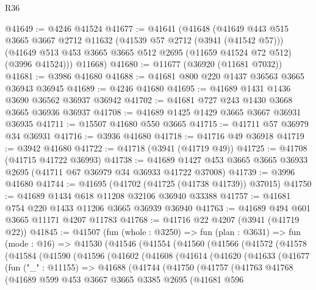 \begin{lexlean}{R36}
\begin{coremodule}
@41649 := @4246 @41524
@41677 := @41641
    (@41648
      (@41649
        @443
        @515
        @3665
        @3667
        @2712
        @11632
        (@41539 @57 @2712 (@3941 (@41542 @57)))
        (@41649 @513 @453 @3665 @3665 @512 @2695 (@11659 @41524 @72 @512) (@3996 @41524)))
      @11668)
@41680 := @11677 (@36920 (@11681 @7032))
@41681 := @3986 @41680
@41688 := @41681 @800 @220 @1437 @36563 @3665 @36943 @36945
@41689 := @4246 @41680
@41695 := @41689 @1431 @1436 @3690 @36562 @36937 @36942
@41702 := @41681 @727 @243 @1430 @3668 @3665 @36936 @36937
@41708 := @41689 @1425 @1429 @3665 @3667 @36931 @36935
@41711 := @15507 @41680 @550 @3665
@41715 := @41711 @57 @36979 @34 @36931
@41716 := @3936 @41680
@41718 := @41716 @49 @36918
@41719 := @3942 @41680
@41722 := @41718 (@3941 (@41719 @49))
@41725 := @41708 (@41715 @41722 @36993)
@41738 := @41689 @1427 @453 @3665 @3665 @36933 @2695 (@41711 @67 @36979 @34 @36933 @41722 @37008)
@41739 := @3996 @41680
@41744 := @41695 (@41702 (@41725 (@41738 @41739)) @37015)
@41750 := @41689 @1434 @618 @11208 @32106 @36940 @33388
@41757 := @41681 @754 @220 @1433 @11206 @3665 @36939 @36940
@41763 := @41689 @494 @601 @3665 @11171 @4207 @11783
@41768 := @41716 @22 @4207 (@3941 (@41719 @22))
@41845 := @41507
    (fun (whole : @3250) =>
    fun (plan : @3631) =>
    fun (mode : @16) =>
    @41530
      (@41546
        (@41554
          (@41560
            (@41566
              (@41572
                (@41578
                  (@41584
                    (@41590
                      (@41596
                        (@41602
                          (@41608
                            (@41614
                              (@41620
                                (@41633
                                  (@41677
                                    (fun ("_" : @11155) =>
                                    @41688
                                      (@41744
                                        (@41750
                                          (@41757
                                            (@41763
                                              @41768
                                              (@41689
                                                @599
                                                @453
                                                @3667
                                                @3665
                                                @3385
                                                @2695
                                                (@41681
                                                  @596

\end{coremodule}
\end{lexlean}
